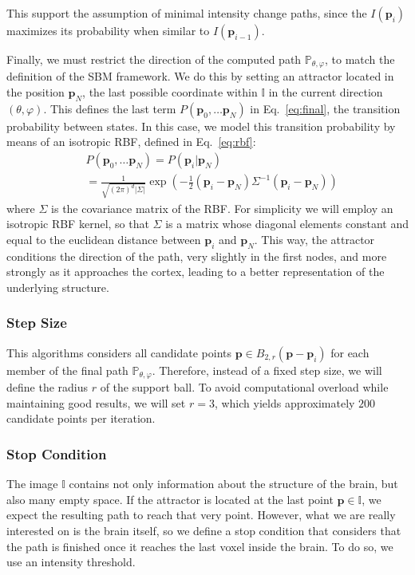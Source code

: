 This support the assumption of minimal intensity change paths, since the $I(\mathbf{p}_i)$ maximizes its probability when similar to $I(\mathbf{p}_{i-1})$. 

Finally, we must restrict the direction of the computed path $\mathbb{P}_{\theta,\varphi}$, to match the definition of the \ac{SBM} framework. We do this by setting an attractor located in the position $\mathbf{p}_N$, the last possible coordinate within $\mathbb{I}$ in the current direction $(\theta,\varphi)$. This defines the last term $P(\mathbf{p}_0, \dots \mathbf{p}_N)$ in Eq.~\ref{eq:final}, the transition probability between states. In this case, we model this transition probability by means of an isotropic \acf{RBF}, defined in Eq.~\ref{eq:rbf}:
\begin{align}\label{eq:rbf}
&P(\mathbf{p}_0, \dots \mathbf{p}_N) = P(\mathbf{p}_i|\mathbf{p}_N)  \\&= \frac{1}{\sqrt{(2\pi)^d|\Sigma|}} \exp\left(-\frac{1}{2}(\mathbf{p}_i-\mathbf{p}_N)\Sigma^{-1}(\mathbf{p}_i-\mathbf{p}_N)\right) 
\end{align}
where $\Sigma$ is the covariance matrix of the \ac{RBF}. For simplicity we will employ an isotropic \ac{RBF} kernel, so that $\Sigma$ is a matrix whose diagonal elements constant and equal to the euclidean distance between $\mathbf{p}_i$ and $\mathbf{p}_N$. This way, the attractor conditions the direction of the path, very slightly in the first nodes, and more strongly as it approaches the cortex, leading to a better representation of the underlying structure.  

\subsubsection{Step Size}
This algorithms considers all candidate points $\mathbf{p} \in B_{2,r}(\mathbf{p}-\mathbf{p}_i)$ for each member of the final path $\mathbb{P}_{\theta,\varphi}$. Therefore, instead of a fixed step size, we will define the radius $r$ of the support ball. To avoid computational overload while maintaining good results, we will set $r=3$, which yields approximately $200$ candidate points per iteration. 

\subsubsection{Stop Condition}
The image $\mathbb{I}$ contains not only information about the structure of the brain, but also many empty space. If the attractor is located at the last point $ \mathbf{p} \in \mathbb{I}$, we expect the resulting path to reach that very point. However, what we are really interested on is the brain itself, so we define a stop condition that considers that the path is finished once it reaches the last voxel inside the brain. To do so, we use an intensity threshold. 

